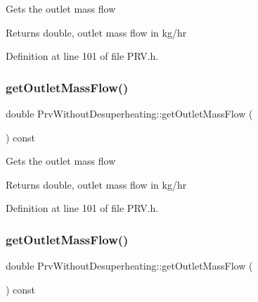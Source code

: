 Gets the outlet mass flow \begin{DoxyReturn}{Returns}
double, outlet mass flow in kg/hr 
\end{DoxyReturn}


Definition at line 101 of file P\+R\+V.\+h.

\mbox{\label{class_prv_without_desuperheating_a12c0bf1f0c29e56e6e07ece3fe865c1b}} 
\subsubsection{\texorpdfstring{get\+Outlet\+Mass\+Flow()}{getOutletMassFlow()}\hspace{0.1cm}{\footnotesize\ttfamily [2/3]}}
{\footnotesize\ttfamily double Prv\+Without\+Desuperheating\+::get\+Outlet\+Mass\+Flow (\begin{DoxyParamCaption}{ }\end{DoxyParamCaption}) const\hspace{0.3cm}{\ttfamily [inline]}}

Gets the outlet mass flow \begin{DoxyReturn}{Returns}
double, outlet mass flow in kg/hr 
\end{DoxyReturn}


Definition at line 101 of file P\+R\+V.\+h.

\mbox{\label{class_prv_without_desuperheating_a12c0bf1f0c29e56e6e07ece3fe865c1b}} 
\subsubsection{\texorpdfstring{get\+Outlet\+Mass\+Flow()}{getOutletMassFlow()}\hspace{0.1cm}{\footnotesize\ttfamily [3/3]}}
{\footnotesize\ttfamily double Prv\+Without\+Desuperheating\+::get\+Outlet\+Mass\+Flow (\begin{DoxyParamCaption}{ }\end{DoxyParamCaption}) const\hspace{0.3cm}{\ttfamily [inline]}}

